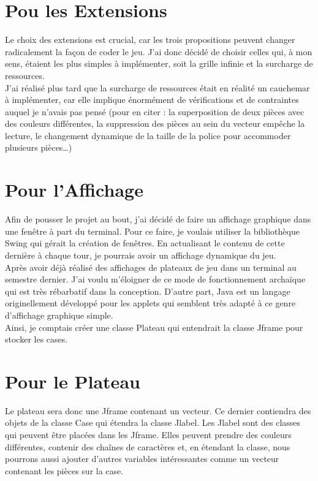 \documentclass[titlepage]{report}
\begin{document}
\section{Pou les Extensions}
Le choix des extensions est crucial, car les trois propositions peuvent changer radicalement la façon de coder le jeu. J’ai donc décidé de choisir celles qui, à mon sens, étaient les plus simples à implémenter, soit la grille infinie et la surcharge de ressources.\\

J’ai réalisé plus tard que la surcharge de ressources était en réalité un cauchemar à implémenter, car elle implique énormément de vérifications et de contraintes auquel je n’avais pas pensé (pour en citer : la superposition de deux pièces avec des couleurs différentes, la suppression des pièces au sein du vecteur empêche la lecture, le changement dynamique de la taille de la police pour accommoder plusieurs pièces…)

\section{Pour l’Affichage}
Afin de pousser le projet au bout, j’ai décidé de faire un affichage graphique dans une fenêtre à part du terminal. Pour ce faire, je voulais utiliser la bibliothèque Swing qui gérait la création de fenêtres.  En actualisant le contenu de cette dernière à chaque tour, je pourrais avoir un affichage dynamique du jeu.\\

Après avoir déjà réalisé des affichages de plateaux de jeu dans un terminal au semestre dernier. J’ai voulu m’éloigner de ce mode de fonctionnement archaïque qui est très rébarbatif dans la conception. D’autre part, Java est un langage originellement développé pour les applets qui semblent très adapté à ce genre d’affichage graphique simple. \\

Ainsi, je comptais créer une classe Plateau qui entendrait la classe Jframe pour stocker les cases.

\section{Pour le Plateau}
Le plateau sera donc une Jframe contenant un vecteur. Ce dernier contiendra des objets de la classe Case qui étendra la classe Jlabel. Les Jlabel sont des classes qui peuvent être placées dans les Jframe. Elles peuvent prendre des couleurs différentes, contenir des chaînes de caractères et, en étendant la classe, nous pourrons aussi ajouter d’autres variables intéressantes comme un vecteur contenant les pièces sur la case.  \\
\end{document}
